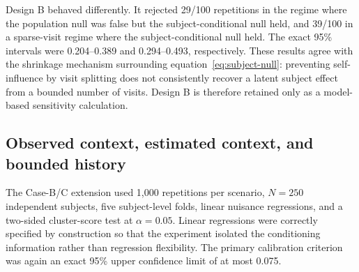 \documentclass[11pt]{article}
\theoremstyle{definition}
\begin{document}
\begin{table}[!ht]
\centering
\caption{Design A rejection rates under six population-null settings. The pre-specified
criterion required every exact 95\% upper confidence limit to be at most 0.075; the
random-slope setting did not meet this criterion.}
\label{tab:stress}
\end{table}

Design B behaved differently. It rejected 29/100 repetitions in the
regime where the population null was false but the subject-conditional null held, and 39/100
in a sparse-visit regime where the subject-conditional null held. The exact 95\% intervals
were 0.204--0.389 and 0.294--0.493, respectively.
These results agree with the shrinkage mechanism surrounding
equation~\eqref{eq:subject-null}: preventing
self-influence by visit splitting does not consistently recover a latent subject effect from
a bounded number of visits. Design B is therefore retained only as a model-based sensitivity
calculation.

\subsection{Observed context, estimated context, and bounded history}

The Case-B/C extension used 1,000 repetitions per scenario, $N=250$ independent subjects,
five subject-level folds, linear nuisance regressions, and a two-sided cluster-score test at
$\alpha=0.05$. Linear regressions were correctly specified by construction so that the
experiment isolated the conditioning information rather than regression flexibility. The
primary calibration criterion was again an exact 95\% upper confidence limit of at most
0.075.
\end{document}
